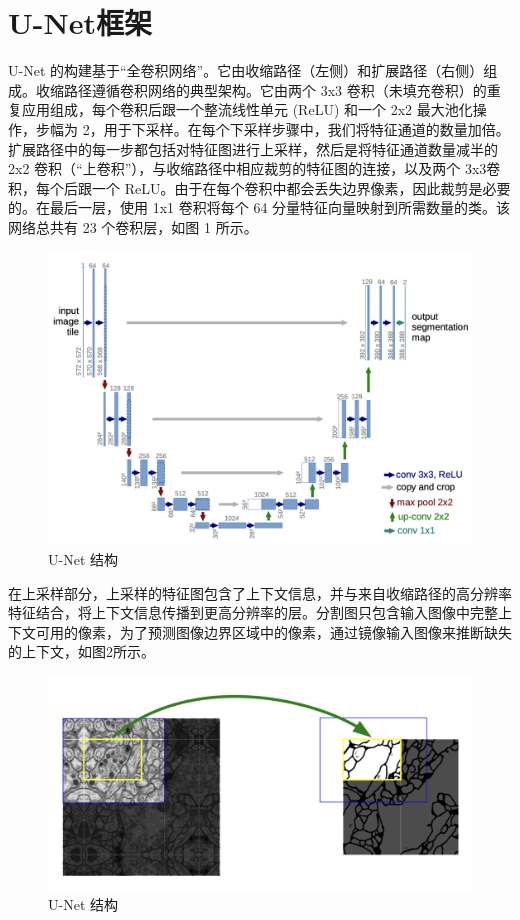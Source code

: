 \documentclass[letterpaper, 10pt, conference, twoside]{ieeeconf}
\begin{document}
\section{U-Net框架}
U-Net 的构建基于“全卷积网络”。它由收缩路径（左侧）和扩展路径（右侧）组成。收缩路径遵循卷积网络的典型架构。它由两个 3x3 卷积（未填充卷积）的重复应用组成，每个卷积后跟一个整流线性单元 (ReLU) 和一个 2x2 最大池化操作，步幅为 2，用于下采样。在每个下采样步骤中，我们将特征通道的数量加倍。扩展路径中的每一步都包括对特征图进行上采样，然后是将特征通道数量减半的 2x2 卷积（“上卷积”），与收缩路径中相应裁剪的特征图的连接，以及两个 3x3卷积，每个后跟一个 ReLU。由于在每个卷积中都会丢失边界像素，因此裁剪是必要的。在最后一层，使用 1x1 卷积将每个 64 分量特征向量映射到所需数量的类。该网络总共有 23 个卷积层，如图 1 所示。
\begin{figure}[htbp]
  \centering
  \includegraphics[width = 1\linewidth]{structure.png}
  \caption{U-Net 结构}
  \label{fig:fig1}
\end{figure}

在上采样部分，上采样的特征图包含了上下文信息，并与来自收缩路径的高分辨率特征结合，将上下文信息传播到更高分辨率的层。分割图只包含输入图像中完整上下文可用的像素，为了预测图像边界区域中的像素，通过镜像输入图像来推断缺失的上下文，如图2所示。

\begin{figure}[htbp]
  \centering
  \includegraphics[width = 1\linewidth]{seamless-seg.png}
  \caption{U-Net 结构}
  \label{fig:fig2}
\end{figure}
\end{document}
